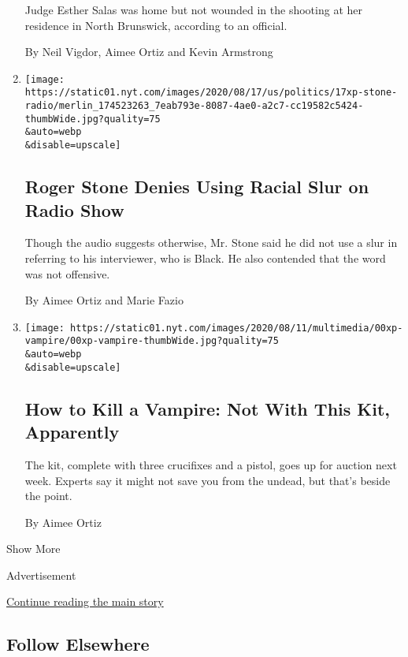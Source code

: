 \begin{enumerate}
  Judge Esther Salas was home but not wounded in the shooting at her
  residence in North Brunswick, according to an official.

  By Neil Vigdor, Aimee Ortiz and Kevin Armstrong
\item
  \href{/2020/07/19/us/politics/roger-stone-mo-kelly-slur.html}{}

  \texttt{[image: https://static01.nyt.com/images/2020/08/17/us/politics/17xp-stone-radio/merlin\_174523263\_7eab793e-8087-4ae0-a2c7-cc19582c5424-thumbWide.jpg?quality=75\\\&auto=webp\\\&disable=upscale]}

  \hypertarget{roger-stone-denies-using-racial-slur-on-radio-show}{%
  \subsection{Roger Stone Denies Using Racial Slur on Radio
  Show}\label{roger-stone-denies-using-racial-slur-on-radio-show}}

  Though the audio suggests otherwise, Mr. Stone said he did not use a
  slur in referring to his interviewer, who is Black. He also contended
  that the word was not offensive.

  By Aimee Ortiz and Marie Fazio
\item
  \href{/2020/07/18/arts/vampire-slaying-kit-auction-uk.html}{}

  \texttt{[image: https://static01.nyt.com/images/2020/08/11/multimedia/00xp-vampire/00xp-vampire-thumbWide.jpg?quality=75\\\&auto=webp\\\&disable=upscale]}

  \hypertarget{how-to-kill-a-vampire-not-with-this-kit-apparently}{%
  \subsection{How to Kill a Vampire: Not With This Kit,
  Apparently}\label{how-to-kill-a-vampire-not-with-this-kit-apparently}}

  The kit, complete with three crucifixes and a pistol, goes up for
  auction next week. Experts say it might not save you from the undead,
  but that's beside the point.

  By Aimee Ortiz
\end{enumerate}

Show More

Advertisement

\protect\hyperlink{after-mid2}{Continue reading the main story}

\hypertarget{follow-elsewhere}{%
\subsection{Follow Elsewhere}\label{follow-elsewhere}}

